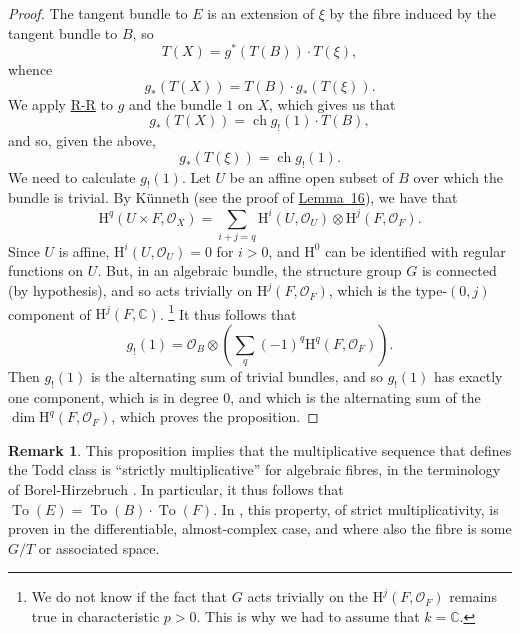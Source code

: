 \documentclass{article}
\theoremstyle{plain}
\theoremstyle{definition}
\newtheorem*{remark}{Remark}
\newcommand{\scr}[1]{{\mathscr{#1}}}
\newcommand{\HH}{\mathrm{H}}
\DeclareMathOperator{\ch}{ch}
\newcommand{\oldpage}[1]{\marginpar{\footnotesize$\Big\vert$ \textit{p.~#1}}}
\begin{document}
\begin{proof}
  The tangent bundle to $E$ is an extension of $\xi$ by the fibre induced by the tangent bundle to $B$, so
  \[
    T(X) = g^*(T(B))\cdot T(\xi),
  \]
  whence
  \[
    g_*(T(X)) = T(B)\cdot g_*(T(\xi)).
  \]
  We apply \hyperref[theoremriemannroch]{R-R} to $g$ and the bundle $1$ on $X$, which gives us that
  \[
    g_*(T(X)) = \ch g_!(1)\cdot T(B),
  \]
  and so, given the above,
  \[
    g_*(T(\xi)) = \ch g_!(1).
  \]
  We need to calculate $g_!(1)$.
  Let $U$ be an affine open subset of $B$ over which the bundle is trivial.
  By K\"{u}nneth (see the proof of \hyperref[lemma16]{Lemma~16}), we have that
  \[
    \HH^q(U\times F,\scr{O}_X)
    = \sum_{i+j=q} \HH^i(U,\scr{O}_U)\otimes\HH^j(F,\scr{O}_F).
  \]
  Since $U$ is affine, $\HH^i(U,\scr{O}_U)=0$ for $i>0$, and $\HH^0$ can be identified with regular functions on $U$.
  But, in an algebraic bundle, the structure group $G$ is connected (by hypothesis), and so acts trivially on $\HH^j(F,\scr{O}_F)$, which is the type-$(0,j)$ component of $\HH^j(F,\mathbb{C})$.
  \footnote{We do not know if the fact that $G$ acts trivially on the $\HH^j(F,\scr{O}_F)$ remains true in characteristic $p>0$. This is why we had to assume that $k=\mathbb{C}$.}
  It thus follows that
  \[
    g_!(1)
    = \scr{O}_B \otimes \left(
      \sum_q (-1)^q \HH^q(F,\scr{O}_F)
    \right).
  \]
  Then $g_!(1)$ is the alternating sum of trivial bundles, and so $g_!(1)$ has exactly one component, which is in degree $0$, and which is the alternating sum of the $\dim\HH^q(F,\scr{O}_F)$, which proves the proposition.
\end{proof}

\oldpage{136}
\begin{remark}
  This proposition implies that the multiplicative sequence that defines the Todd class is ``strictly multiplicative'' for algebraic fibres, in the terminology of Borel-Hirzebruch \cite{2}.
  In particular, it thus follows that $\operatorname{To}(E)=\operatorname{To}(B)\cdot\operatorname{To}(F)$.
  In \cite{2}, this property, of strict multiplicativity, is proven in the differentiable, almost-complex case, and where also the fibre is some $G/T$ or associated space.
\end{remark}



\nocite{*}
\end{document}
